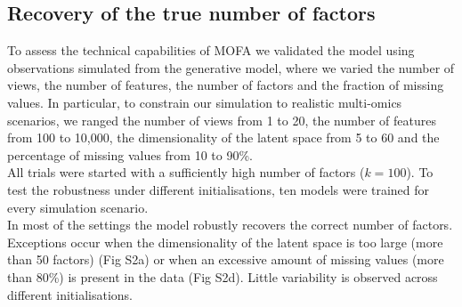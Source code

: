 \documentclass[10pt, a4paper,openany]{report}
\begin{document}
\subsection{Recovery of the true number of factors}
To assess the technical capabilities of MOFA we validated the model using observations simulated from the generative model, where we varied the number of views, the number of features, the number of factors and the fraction of missing values. In particular, to constrain our simulation to realistic multi-omics scenarios, we ranged the number of views from 1 to 20, the number of features from 100 to 10,000, the dimensionality of the latent space from 5 to 60 and the percentage of missing values from 10 to 90\%.\\
All trials were started with a sufficiently high number of factors ($k=100$). To test the robustness under different initialisations, ten models were trained for every simulation scenario.\\

In most of the settings the model robustly recovers the correct number of factors. Exceptions occur when the dimensionality of the latent space is too large (more than 50 factors) (Fig S2a) or when an excessive amount of missing values (more than 80\%) is present in the data (Fig S2d). Little variability is observed across different initialisations.

\end{document}
